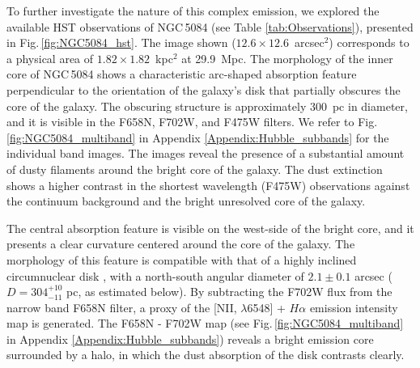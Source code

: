\documentclass[modern]{CORE-AAS/aastex631}
\begin{document}
To further investigate the nature of this complex emission, we explored the available HST observations of NGC\,5084 (see Table \ref{tab:Observations}), presented in Fig.\,\ref{fig:NGC5084_hst}. 
The image shown ($12.6\times12.6$~arcsec$^2$) corresponds to a physical area of $1.82\times1.82$~kpc$^2$ at 29.9~Mpc. The morphology of the inner core of NGC\,5084 shows a characteristic arc-shaped absorption feature perpendicular to the orientation of the galaxy's disk that partially obscures the core of the galaxy. The obscuring structure is approximately 300~pc in diameter, and it is visible in the F658N, F702W, and F475W filters. We refer to Fig.\,\ref{fig:NGC5084_multiband} in Appendix \ref{Appendix:Hubble_subbands} for the individual band images. The images reveal the presence of a substantial amount of dusty filaments around the bright core of the galaxy. The dust extinction shows a higher contrast in the shortest wavelength (F475W) observations against the continuum background and the bright unresolved core of the galaxy.

The central absorption feature is visible on the west-side of the bright core, and it presents a clear curvature centered around the core of the galaxy. The morphology of this feature is compatible with that of a highly inclined circumnuclear disk \citep{moellenhoff+1987aap174_63, jaffe+1993nat364_213,  kormendy+1994inproceedings_147, ferrarese+1996apj470_444, vandermarel+1998aj116_2220}, with a north-south angular diameter of $2.1\pm0.1$ arcsec ($D=304^{+10}_{-11}$ pc, as estimated below). By subtracting the F702W flux from the narrow band F658N filter, a proxy of the [NII, $\lambda$6548] + $H\alpha$ emission intensity map is generated. The F658N - F702W map (see Fig.\,\ref{fig:NGC5084_multiband} in Appendix \ref{Appendix:Hubble_subbands}) reveals a bright emission core surrounded by a halo, in which the dust absorption of the disk contrasts clearly. 
\end{document}
